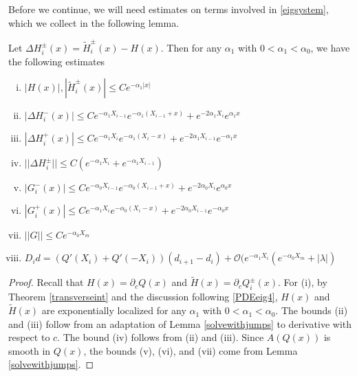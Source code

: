\documentclass[thesis.tex]{subfiles}
\begin{document}
Before we continue, we will need estimates on terms involved in \eqref{eigsystem}, which we collect in the following lemma.
\begin{lemma}\label{stabestimates}
Let $\Delta H_i^\pm(x) = \tilde{H}_i^\pm(x) - H(x)$. Then for any $\alpha_1$ with $0 < \alpha_1 < \alpha_0$, we have the following estimates
\begin{enumerate}[(i)]
\item $|H(x)|, |\tilde{H}_i^\pm(x)| \leq C e^{-\alpha_1 |x|}$
\item $|\Delta H_i^-(x)| \leq C e^{-\alpha_1 X_{i-1}} e^{-\alpha_1(X_{i-1} + x) } + e^{-2 \alpha_1 X_i} e^{\alpha_1 x}$
\item $|\Delta H_i^+(x)| \leq C e^{-\alpha_1 X_i} e^{-\alpha_1(X_i - x) } + e^{-2 \alpha_1 X_{i-1}} e^{-\alpha_1 x}$
\item $||\Delta H_i^\pm|| \leq C(e^{-\alpha_1 X_i} + e^{-\alpha_1 X_{i-1}} )$
\item $|G_i^-(x)| \leq C e^{-\alpha_0 X_{i-1}} e^{-\alpha_0(X_{i-1} + x) } + e^{-2 \alpha_0 X_i} e^{\alpha_0 x}$
\item $|G_i^+(x)| \leq C e^{-\alpha_1 X_i} e^{-\alpha_0(X_i - x) } + e^{-2 \alpha_0 X_{i-1}} e^{-\alpha_0 x}$
\item $||G|| \leq C e^{-\alpha_0 X_m}$
\item $D_i d = ( Q'(X_i) + Q'(-X_i))(d_{i+1} - d_i ) + \mathcal{O} ( e^{-\alpha_1 X_i} (e^{-\alpha_0 X_m} + |\lambda| )$
\end{enumerate}
\begin{proof}
Recall that $H(x) = \partial_c Q(x)$ and $\tilde{H}(x) = \partial_c Q_i^\pm(x)$. For (i), by Theorem \ref{transverseint} and the discussion following \eqref{PDEeig4}, $H(x)$ and $\tilde{H}(x)$ are exponentially localized for any $\alpha_1$ with $0 < \alpha_1 < \alpha_0$. The bounds (ii) and (iii) follow from an adaptation of Lemma \ref{solvewithjumps} to derivative with respect to $c$. The bound (iv) follows from (ii) and (iii). Since $A(Q(x))$ is smooth in $Q(x)$, the bounds (v), (vi), and (vii) come from Lemma \ref{solvewithjumps}.


\end{proof}
\end{lemma}
\end{document}
